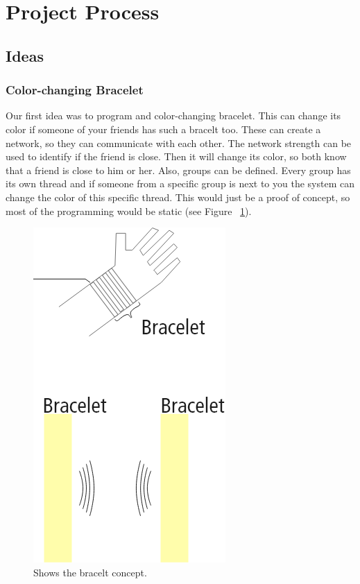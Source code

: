\documentclass[doc.tex]{subfiles}
\begin{document}
    \section{Project Process}
    \subsection{Ideas}
    \subsubsection{Color-changing Bracelet}
    \begin{flushleft}
        Our first idea was to program and color-changing bracelet. This can change its color if someone of your
        friends has such a bracelt too. These can create a network, so they can communicate with each other. The
        network strength can be used to identify if the friend is close. Then it will change its color, so both know
        that a friend is close to him or her. Also, groups can be defined. Every group has its own thread and if someone 
        from a specific group is next to you the system can change the color of this specific thread. This would just 
        be a proof of concept, so most of the programming would be static (see Figure ~\ref{fig:braceltIdea}).
    \end{flushleft}

    \begin{figure}[h!]
        \centering
        \includegraphics[scale=0.4]{images/projectideas/bracelt.png}
        \caption{Shows the bracelt concept.}
        \label{fig:braceltIdea}
    \end{figure}
\end{document}
